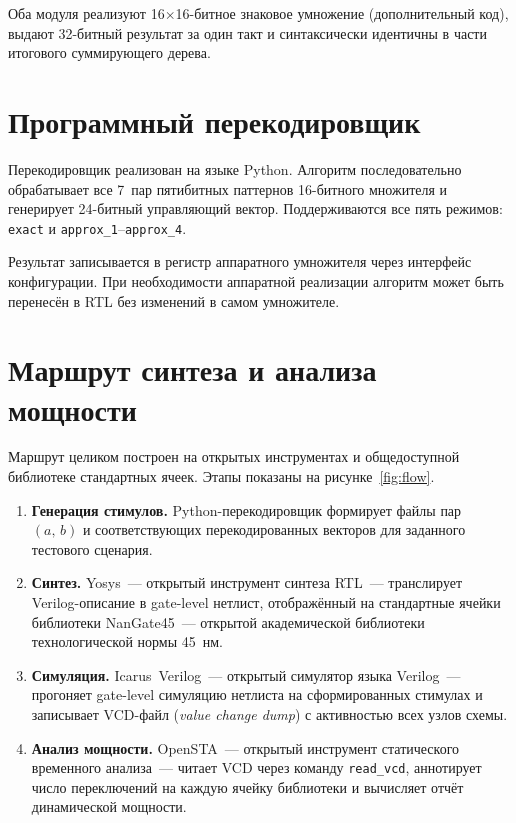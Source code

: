 \documentclass[a4paper, 12pt, oneside]{report}
\begin{document}
Оба модуля реализуют 16$\times$16-битное знаковое умножение
(дополнительный код), выдают 32-битный результат за один такт
и синтаксически идентичны в части итогового суммирующего дерева.

\section{Программный перекодировщик}

Перекодировщик реализован на языке Python. Алгоритм последовательно
обрабатывает все 7~пар пятибитных паттернов 16-битного множителя
и генерирует 24-битный управляющий вектор. Поддерживаются все пять
режимов: \texttt{exact} и \texttt{approx\_1}--\texttt{approx\_4}.

Результат записывается в регистр аппаратного умножителя через
интерфейс конфигурации. При необходимости аппаратной реализации
алгоритм может быть перенесён в RTL без изменений в самом умножителе.

\section{Маршрут синтеза и анализа мощности}

Маршрут целиком построен на открытых инструментах и общедоступной
библиотеке стандартных ячеек. Этапы показаны на
рисунке~\ref{fig:flow}.

\begin{enumerate}
  \item \textbf{Генерация стимулов.} Python-перекодировщик формирует
        файлы пар $(a,\,b)$ и соответствующих перекодированных
        векторов для заданного тестового сценария.
  \item \textbf{Синтез.} Yosys~--- открытый инструмент синтеза RTL~---
        транслирует Verilog-описание в gate-level нетлист,
        отображённый на стандартные ячейки библиотеки
        NanGate45~--- открытой академической библиотеки
        технологической нормы 45~нм.
  \item \textbf{Симуляция.} Icarus~Verilog~--- открытый симулятор
        языка Verilog~--- прогоняет gate-level симуляцию нетлиста
        на сформированных стимулах и записывает VCD-файл
        (\textit{value change dump}) с активностью всех узлов схемы.
  \item \textbf{Анализ мощности.} OpenSTA~--- открытый инструмент
        статического временно\-го анализа~--- читает VCD через
        команду \texttt{read\_vcd}, аннотирует число переключений
        на каждую ячейку библиотеки и вычисляет отчёт динамической
        мощности.
\end{enumerate}
\end{document}
